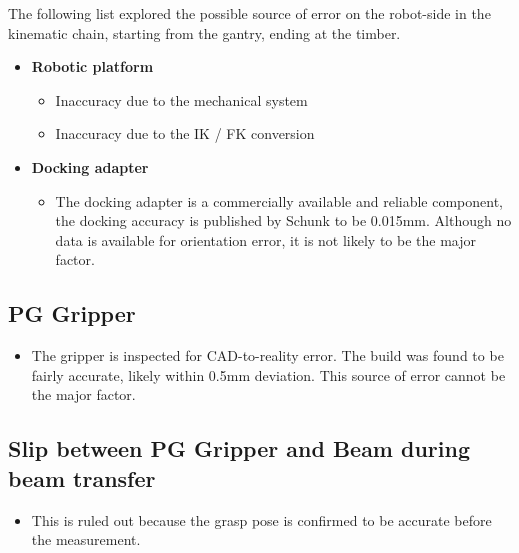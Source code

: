\documentclass[11pt]{book}
\begin{document}
The following list explored the possible source of error on the robot-side in the kinematic chain, starting from the gantry, ending at the timber.

\begin{itemize}
	\item \textbf{Robotic platform}

\begin{itemize}
	\item Inaccuracy due to the mechanical system

	\item Inaccuracy due to the IK / FK conversion

\end{itemize}
	\item \textbf{Docking adapter}

\begin{itemize}
	\item The docking adapter is a commercially available and reliable component, the docking accuracy is published by Schunk to be 0.015mm. Although no data is available for orientation error, it is not likely to be the major factor.

\end{itemize}
\end{itemize}
\subsection{PG Gripper}

\begin{itemize}
\begin{itemize}
	\item The gripper is inspected for CAD-to-reality error. The build was found to be fairly accurate, likely within 0.5mm deviation. This source of error cannot be the major factor.

\end{itemize}
\end{itemize}
\subsection{Slip between PG Gripper and Beam during beam transfer}

\begin{itemize}
\begin{itemize}
	\item This is ruled out because the grasp pose is confirmed to be accurate before the measurement.

\end{itemize}
\end{itemize}
\end{document}
